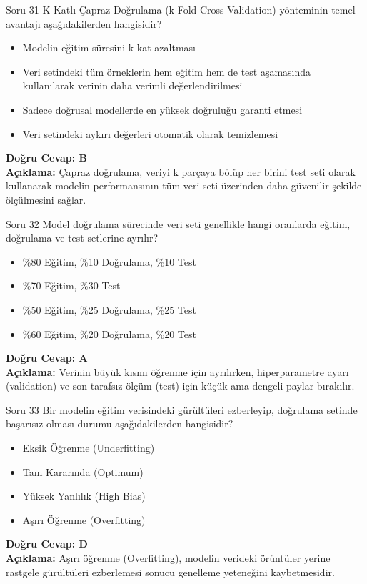 \documentclass[12pt,a4paper]{article}
\begin{document}
\begin{testcard}{Soru 31}
    K-Katlı Çapraz Doğrulama (k-Fold Cross Validation) yönteminin temel avantajı aşağıdakilerden hangisidir?
    \begin{itemize}
        \item[A)] Modelin eğitim süresini k kat azaltması
        \item[B)] Veri setindeki tüm örneklerin hem eğitim hem de test aşamasında kullanılarak verinin daha verimli değerlendirilmesi
        \item[C)] Sadece doğrusal modellerde en yüksek doğruluğu garanti etmesi
        \item[D)] Veri setindeki aykırı değerleri otomatik olarak temizlemesi
    \end{itemize}
    \tcblower
    \textbf{Doğru Cevap: B} \\
    \textbf{Açıklama:} Çapraz doğrulama, veriyi k parçaya bölüp her birini test seti olarak kullanarak modelin performansının tüm veri seti üzerinden daha güvenilir şekilde ölçülmesini sağlar.
\end{testcard}

\begin{testcard}{Soru 32}
    Model doğrulama sürecinde veri seti genellikle hangi oranlarda eğitim, doğrulama ve test setlerine ayrılır?
    \begin{itemize}
        \item[A)] \%80 Eğitim, \%10 Doğrulama, \%10 Test
        \item[B)] \%70 Eğitim, \%30 Test
        \item[C)] \%50 Eğitim, \%25 Doğrulama, \%25 Test
        \item[D)] \%60 Eğitim, \%20 Doğrulama, \%20 Test
    \end{itemize}
    \tcblower
    \textbf{Doğru Cevap: A} \\
    \textbf{Açıklama:} Verinin büyük kısmı öğrenme için ayrılırken, hiperparametre ayarı (validation) ve son tarafsız ölçüm (test) için küçük ama dengeli paylar bırakılır.
\end{testcard}

\begin{testcard}{Soru 33}
    Bir modelin eğitim verisindeki gürültüleri ezberleyip, doğrulama setinde başarısız olması durumu aşağıdakilerden hangisidir?
    \begin{itemize}
        \item[A)] Eksik Öğrenme (Underfitting)
        \item[B)] Tam Kararında (Optimum)
        \item[C)] Yüksek Yanlılık (High Bias)
        \item[D)] Aşırı Öğrenme (Overfitting)
    \end{itemize}
    \tcblower
    \textbf{Doğru Cevap: D} \\
    \textbf{Açıklama:} Aşırı öğrenme (Overfitting), modelin verideki örüntüler yerine rastgele gürültüleri ezberlemesi sonucu genelleme yeteneğini kaybetmesidir.
\end{testcard}
\end{document}
